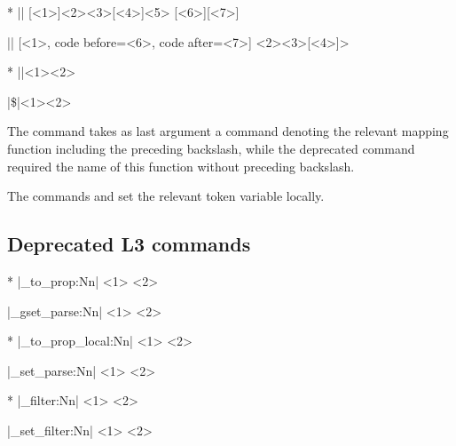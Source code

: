 \documentclass[a4paper]{article}
\begin{document}
{{\begin{macrodeprecated}*
|\JSONParseArrayValuesMap|
  [<1>]{<2>}{<3>}[<4>]{<5>}
  [<6>][<7>]
\end{macrodeprecated}
\hfill
\begin{macroreplacement}
|\JSONParseArrayMapFunction|
  [<1>, code before={<6>},
    code after={<7>}]
  {<2>}{<3>}[<4>]{>}
\end{macroreplacement}

\begin{macrodeprecated}*
|\x|{<1>}{<2>}
\end{macrodeprecated}
\hfill
\begin{macroreplacement}
|\$|{<1>}{<2>}
\end{macroreplacement}

The command \macro{\JSONParseArrayMapFunction} takes as last argument a command denoting the relevant mapping function including the preceding backslash, while the deprecated command \macro{\JSONParseArrayValuesMap} required the name of this function without preceding backslash.

The commands \macro{\JSONParseSetRescanValue} and \macro{\JSONParseSetKeys} set the relevant token variable locally.

\subsection{Deprecated L3 commands}

\begin{macrodeprecated}*
|\jsonparse_to_prop:Nn|
  <1> {<2>}
\end{macrodeprecated}
\hfill
\begin{macroreplacement}
|\jsonparse_gset_parse:Nn|
  <1> {<2>}
\end{macroreplacement}

\begin{macrodeprecated}*
|\jsonparse_to_prop_local:Nn|
  <1> {<2>}
\end{macrodeprecated}
\hfill
\begin{macroreplacement}
|\jsonparse_set_parse:Nn|
  <1> {<2>}
\end{macroreplacement}

\begin{macrodeprecated}*
|\jsonparse_filter:Nn|
  <1> {<2>}
\end{macrodeprecated}
\hfill
\begin{macroreplacement}
|\jsonparse_set_filter:Nn|
  <1> {<2>}
\end{macroreplacement}

}}
\end{document}

